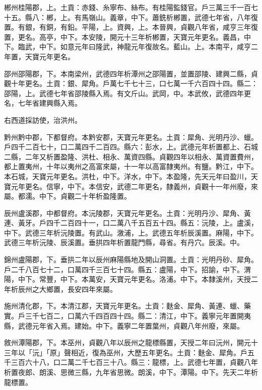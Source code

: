 \begin{pinyinscope}
 郴州桂陽郡，上。土貢：赤錢、糸寧布、絲布。有桂陽監錢官。戶三萬三千一百七十五。縣八：郴，上。有馬嶺山。義章，中下。蕭銑析郴置，武德七年省，八年復置。有銀，有銅，有鉛。平陽，上。資興，上。本晉興，貞觀八年省，咸亨三年復置，更名。高亭，中下。本安陵，開元十三年析郴置，天寶元年更名。義昌，中下。臨武，中下。如意元年曰隆武，神龍元年復故名。藍山。上。本南平，咸亨二年置，天寶元年更名。



 邵州邵陽郡，下。本南梁州，武德四年析潭州之邵陽置，並置邵陵、建興二縣，貞觀十年更名。土貢：銀、犀角。戶萬七千七十三，口七萬一千六百四十四。縣二：邵陽，上。武德七年省邵陵縣入焉。有文斤山。武岡，中。本武攸，武德四年更名，七年省建興縣入焉。



 右西道採訪使，治洪州。



 黔州黔中郡，下都督府。本黔安郡，天寶元年更名。土貢：犀角、光明丹沙、蠟。戶四千二百七十，口二萬四千二百四。縣六：彭水，上。武德元年析置都上、石城二縣，二年又析置盈隆、洪杜、相永、萬資四縣。貞觀四年以相永、萬資置費州，都上置夷州，十年以夷州之高富來屬，十一年以高富隸夷州。有鹽。黔江，中下。本石城，天寶元年更名。洪杜，中下。洋水，中下。本盈隆，先天元年曰盈川，天寶元年更名。信寧，中下。本信安，武德二年更名，隸義州，貞觀十一年州廢，來屬。都濡。中下。貞觀二十年析盈隆置。



 辰州盧溪郡，中都督府。本沅陵郡，天寶元年更名。土貢：光明丹沙、犀角、黃連、黃牙。戶四千二百四十一，口二萬八千五百五十四。縣五：沅陵，上。盧溪，中下。武德三年析沅陵置。有武山。漵浦，上。武德五年析辰溪置。麻陽，中下。武德三年析沅陵、辰溪置。垂拱四年析置龍門縣，尋省。有丹穴。辰溪。中。



 錦州盧陽郡，下。垂拱二年以辰州麻陽縣地及開山洞置。土貢：光明丹砂、犀角。戶二千八百七十二，口萬四千三百七十四。縣五：盧陽，中下。招諭，中下。渭陽，中下。常豐，中下。本萬安，天寶元年更名。洛浦。中下。本隸溪州，天授二年析辰州之大鄉置，長安四年來屬。



 施州清化郡，下。本清江郡，天寶元年更名。土貢：麩金、犀角、黃連、蠟、藥實。戶三千七百二，口萬六千四百四十四。縣二：清江，中下。義寧元年置開夷縣，武德元年省入焉。建始。中下。義寧二年置葉州，貞觀八年州廢，來屬。



 敘州潭陽郡，下。本巫州，貞觀八年以辰州之龍標縣置，天授二年曰沅州，開元十三年以「沅」「原」聲相近，復為巫州，大歷五年更名。土貢：麩金、犀角。戶五千三百六十八，口二萬二千七百三十八。縣三：龍標，上。武德七年置，貞觀八年析置夜郎、朗溪、思微三縣，九年省思微。朗溪，中下。潭陽。中下。先天二年析龍標置。




\end{pinyinscope}
